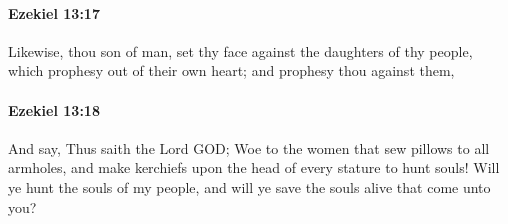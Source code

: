 		\paragraph{Ezekiel 13:17} %
			\label{EZEKIEL-13-17}

			Likewise, thou son of man, set thy face against the daughters of thy people, which prophesy out of their own heart; and prophesy thou against them,


		\paragraph{Ezekiel 13:18} %
			\label{EZEKIEL-13-18}

			And say, Thus saith the Lord GOD; Woe to the women that sew pillows to all armholes, and make kerchiefs upon the head of every stature to hunt souls! Will ye hunt the souls of my people, and will ye save the souls alive that come unto you?

